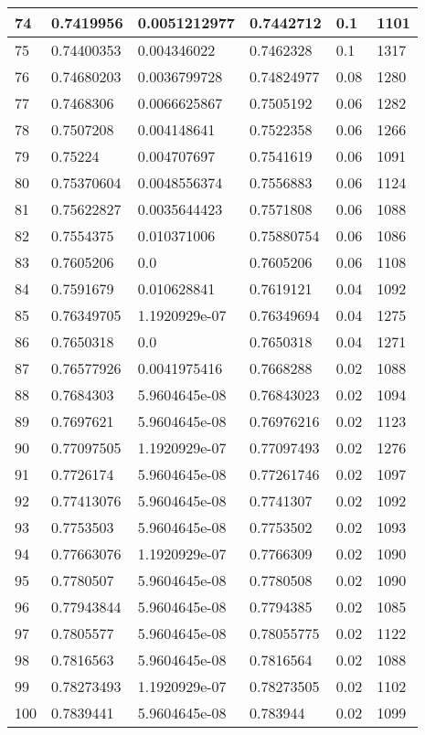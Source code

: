 \begin{longtable}{|l|l|l|l|l|l|}
74 & 0.7419956 & 0.0051212977 & 0.7442712 & 0.1 & 1101 \\ \hline 
75 & 0.74400353 & 0.004346022 & 0.7462328 & 0.1 & 1317 \\ \hline 
76 & 0.74680203 & 0.0036799728 & 0.74824977 & 0.08 & 1280 \\ \hline 
77 & 0.7468306 & 0.0066625867 & 0.7505192 & 0.06 & 1282 \\ \hline 
78 & 0.7507208 & 0.004148641 & 0.7522358 & 0.06 & 1266 \\ \hline 
79 & 0.75224 & 0.004707697 & 0.7541619 & 0.06 & 1091 \\ \hline 
80 & 0.75370604 & 0.0048556374 & 0.7556883 & 0.06 & 1124 \\ \hline 
81 & 0.75622827 & 0.0035644423 & 0.7571808 & 0.06 & 1088 \\ \hline 
82 & 0.7554375 & 0.010371006 & 0.75880754 & 0.06 & 1086 \\ \hline 
83 & 0.7605206 & 0.0 & 0.7605206 & 0.06 & 1108 \\ \hline 
84 & 0.7591679 & 0.010628841 & 0.7619121 & 0.04 & 1092 \\ \hline 
85 & 0.76349705 & 1.1920929e-07 & 0.76349694 & 0.04 & 1275 \\ \hline 
86 & 0.7650318 & 0.0 & 0.7650318 & 0.04 & 1271 \\ \hline 
87 & 0.76577926 & 0.0041975416 & 0.7668288 & 0.02 & 1088 \\ \hline 
88 & 0.7684303 & 5.9604645e-08 & 0.76843023 & 0.02 & 1094 \\ \hline 
89 & 0.7697621 & 5.9604645e-08 & 0.76976216 & 0.02 & 1123 \\ \hline 
90 & 0.77097505 & 1.1920929e-07 & 0.77097493 & 0.02 & 1276 \\ \hline 
91 & 0.7726174 & 5.9604645e-08 & 0.77261746 & 0.02 & 1097 \\ \hline 
92 & 0.77413076 & 5.9604645e-08 & 0.7741307 & 0.02 & 1092 \\ \hline 
93 & 0.7753503 & 5.9604645e-08 & 0.7753502 & 0.02 & 1093 \\ \hline 
94 & 0.77663076 & 1.1920929e-07 & 0.7766309 & 0.02 & 1090 \\ \hline 
95 & 0.7780507 & 5.9604645e-08 & 0.7780508 & 0.02 & 1090 \\ \hline 
96 & 0.77943844 & 5.9604645e-08 & 0.7794385 & 0.02 & 1085 \\ \hline 
97 & 0.7805577 & 5.9604645e-08 & 0.78055775 & 0.02 & 1122 \\ \hline 
98 & 0.7816563 & 5.9604645e-08 & 0.7816564 & 0.02 & 1088 \\ \hline 
99 & 0.78273493 & 1.1920929e-07 & 0.78273505 & 0.02 & 1102 \\ \hline 
100 & 0.7839441 & 5.9604645e-08 & 0.783944 & 0.02 & 1099 \\ \hline 
\end{longtable}